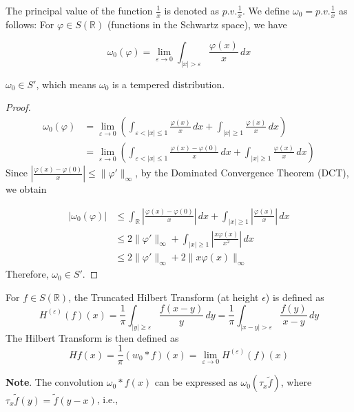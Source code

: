 \begin{definition}
    The principal value of the function $\frac{1}{x}$ is denoted as $p.v. \frac{1}{x}$. We define $\omega_0 = p.v. \frac{1}{x}$ as follows: For $\varphi \in S(\mathbb{R})$ (functions in the Schwartz space), we have

$$\omega_0(\varphi) = \lim_{\varepsilon \rightarrow 0} \int_{|x| > \varepsilon} \frac{\varphi(x)}{x} \, dx$$
\end{definition}
\begin{proposition}
     $\omega_0 \in S'$, which means $\omega_0$ is a tempered distribution.
\end{proposition}
\begin{proof}
    $$\begin{aligned}
\omega_0(\varphi) &= \lim_{\varepsilon \rightarrow 0} \left( \int_{\varepsilon < |x| \leq 1} \frac{\varphi(x)}{x} \, dx + \int_{|x| \geq 1} \frac{\varphi(x)}{x} \, dx \right) \\
&= \lim_{\varepsilon \rightarrow 0} \left( \int_{\varepsilon < |x| \leq 1} \frac{\varphi(x) - \varphi(0)}{x} \, dx + \int_{|x| \geq 1} \frac{\varphi(x)}{x} \, dx \right)
\end{aligned}$$Since $\left| \frac{\varphi(x) - \varphi(0)}{x} \right| \leq \|\varphi'\|_\infty$, by the Dominated Convergence Theorem (DCT), we obtain

$$\begin{aligned}
|\omega_0(\varphi)| &\leq \int_{\mathbb{R}} \left| \frac{\varphi(x) - \varphi(0)}{x} \right| \, dx + \int_{|x| \geq 1} \left| \frac{\varphi(x)}{x} \right| \, dx \\
&\leq 2\|\varphi'\|_\infty + \int_{|x| \geq 1} \left| \frac{x \varphi(x)}{x^2} \right| \, dx \\
&\leq 2\|\varphi'\|_\infty + 2\|x \varphi(x)\|_\infty
\end{aligned}$$Therefore, $\omega_0 \in S'$.
\end{proof}
\begin{definition}
    For $f \in S(\mathbb{R})$, the Truncated Hilbert Transform (at height $\epsilon$) is defined as
    $$H^{(\varepsilon)}(f)(x) = \frac{1}{\pi} \int_{|y| \geq \varepsilon} \frac{f(x-y)}{y} \, dy = \frac{1}{\pi} \int_{|x-y| > \varepsilon} \frac{f(y)}{x-y} \, dy$$
    The Hilbert Transform is then defined as
    $$Hf(x) = \frac{1}{\pi} (w_0 * f)(x) = \lim_{\varepsilon \rightarrow 0} H^{(\varepsilon)}(f)(x)$$
\end{definition}
\noindent\textbf{Note}. The convolution $\omega_0 * f(x)$ can be expressed as $\omega_0(\tau_x \tilde{f})$, where $\tau_x \tilde{f}(y) = \tilde{f}(y-x)$, i.e.,

